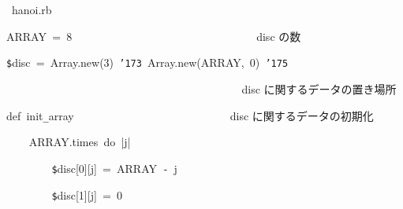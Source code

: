 \documentclass[a4paper,10pt]{article}
\def\mc{\relax}
\begin{document}
\noindent
\mbox{}\hfill

\noindent
\mbox{}\hfill

\noindent
\mbox{}\rm\mc {\tt\#} \hrulefill\ hanoi.rb \ \hrulefill
\tt\mc 

\noindent
\mbox{}\hfill

\noindent
\mbox{}\hfill

\noindent
\mbox{}ARRAY{\tt\mc \ }={\tt\mc \ }8{\tt\mc \ }{\tt\mc \ }{\tt\mc \ }{\tt\mc \ }{\tt\mc \ }{\tt\mc \ }{\tt\mc \ }{\tt\mc \ }{\tt\mc \ }{\tt\mc \ }{\tt\mc \ }{\tt\mc \ }{\tt\mc \ }{\tt\mc \ }{\tt\mc \ }{\tt\mc \ }{\tt\mc \ }{\tt\mc \ }{\tt\mc \ }{\tt\mc \ }{\tt\mc \ }{\tt\mc \ }{\tt\mc \ }{\tt\mc \ }{\tt\mc \ }{\tt\mc \ }{\tt\mc \ }{\tt\mc \ }{\tt\mc \ }{\tt\mc \ }{\tt\mc \ }\rm\mc {\tt\#} \ disc の数 \hfill 
\tt\mc 

\noindent
\mbox{}\hfill

\noindent
\mbox{}{\tt\$}disc{\tt\mc \ }={\tt\mc \ }Array.new(3){\tt\mc \ }{\tt\char'173}{\tt\mc \ }Array.new(ARRAY,{\tt\mc \ }0){\tt\mc \ }{\tt\char'175}

\noindent
\mbox{}{\tt\mc \ }{\tt\mc \ }{\tt\mc \ }{\tt\mc \ }{\tt\mc \ }{\tt\mc \ }{\tt\mc \ }{\tt\mc \ }{\tt\mc \ }{\tt\mc \ }{\tt\mc \ }{\tt\mc \ }{\tt\mc \ }{\tt\mc \ }{\tt\mc \ }{\tt\mc \ }{\tt\mc \ }{\tt\mc \ }{\tt\mc \ }{\tt\mc \ }{\tt\mc \ }{\tt\mc \ }{\tt\mc \ }{\tt\mc \ }{\tt\mc \ }{\tt\mc \ }{\tt\mc \ }{\tt\mc \ }{\tt\mc \ }{\tt\mc \ }{\tt\mc \ }{\tt\mc \ }{\tt\mc \ }{\tt\mc \ }{\tt\mc \ }{\tt\mc \ }{\tt\mc \ }{\tt\mc \ }{\tt\mc \ }{\tt\mc \ }\rm\mc {\tt\#} \ disc に関するデータの置き場所 \hfill 
\tt\mc 

\noindent
\mbox{}\hfill

\noindent
\mbox{}def{\tt\mc \ }init{\tt\_}array{\tt\mc \ }{\tt\mc \ }{\tt\mc \ }{\tt\mc \ }{\tt\mc \ }{\tt\mc \ }{\tt\mc \ }{\tt\mc \ }{\tt\mc \ }{\tt\mc \ }{\tt\mc \ }{\tt\mc \ }{\tt\mc \ }{\tt\mc \ }{\tt\mc \ }{\tt\mc \ }{\tt\mc \ }{\tt\mc \ }{\tt\mc \ }{\tt\mc \ }{\tt\mc \ }{\tt\mc \ }{\tt\mc \ }{\tt\mc \ }{\tt\mc \ }{\tt\mc \ }\rm\mc {\tt\#} \ disc に関するデータの初期化 \hfill 
\tt\mc 

\noindent
\mbox{}{\tt\mc \ }{\tt\mc \ }{\tt\mc \ }{\tt\mc \ }ARRAY.times{\tt\mc \ }do{\tt\mc \ }|j|

\noindent
\mbox{}{\tt\mc \ }{\tt\mc \ }{\tt\mc \ }{\tt\mc \ }{\tt\mc \ }{\tt\mc \ }{\tt\mc \ }{\tt\mc \ }{\tt\$}disc[0][j]{\tt\mc \ }={\tt\mc \ }ARRAY{\tt\mc \ }{\tt -}{\tt\mc \ }j

\noindent
\mbox{}{\tt\mc \ }{\tt\mc \ }{\tt\mc \ }{\tt\mc \ }{\tt\mc \ }{\tt\mc \ }{\tt\mc \ }{\tt\mc \ }{\tt\$}disc[1][j]{\tt\mc \ }={\tt\mc \ }0
\end{document}
